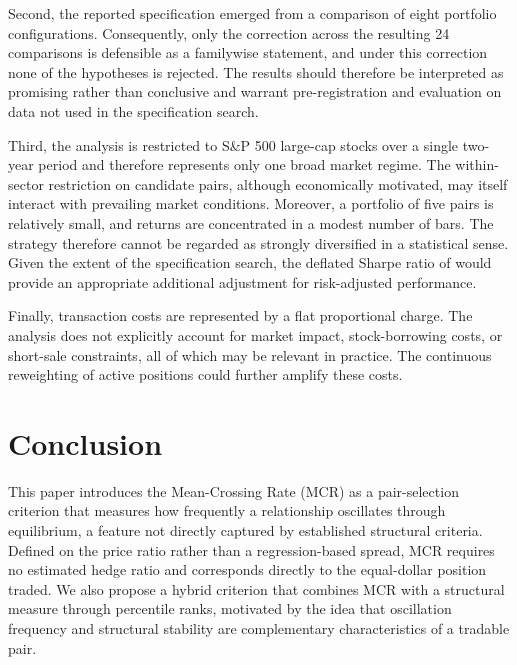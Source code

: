 \documentclass[11pt,a4paper]{article}
\theoremstyle{definition}
\begin{document}
Second, the reported specification emerged from a comparison of eight portfolio
configurations. Consequently, only the correction across the resulting 24
comparisons is defensible as a familywise statement, and under this correction
none of the hypotheses is rejected. The results should therefore be interpreted
as promising rather than conclusive and warrant pre-registration and evaluation
on data not used in the specification search.

Third, the analysis is restricted to S\&P 500 large-cap stocks over a single
two-year period and therefore represents only one broad market regime. The
within-sector restriction on candidate pairs, although economically motivated,
may itself interact with prevailing market conditions. Moreover, a portfolio of
five pairs is relatively small, and returns are concentrated in a modest number
of bars. The strategy therefore cannot be regarded as strongly diversified in a
statistical sense. Given the extent of the specification search, the deflated
Sharpe ratio of \citet{bailey2014} would provide an appropriate additional
adjustment for risk-adjusted performance.

Finally, transaction costs are represented by a flat proportional charge. The
analysis does not explicitly account for market impact, stock-borrowing costs,
or short-sale constraints, all of which may be relevant in practice. The
continuous reweighting of active positions could further amplify these costs.

\section{Conclusion}
\label{sec:conc}

This paper introduces the Mean-Crossing Rate (MCR) as a pair-selection criterion
that measures how frequently a relationship oscillates through equilibrium, a
feature not directly captured by established structural criteria. Defined on the
price ratio rather than a regression-based spread, MCR requires no estimated
hedge ratio and corresponds directly to the equal-dollar position traded. We
also propose a hybrid criterion that combines MCR with a structural measure
through percentile ranks, motivated by the idea that oscillation frequency and
structural stability are complementary characteristics of a tradable pair.
\end{document}
